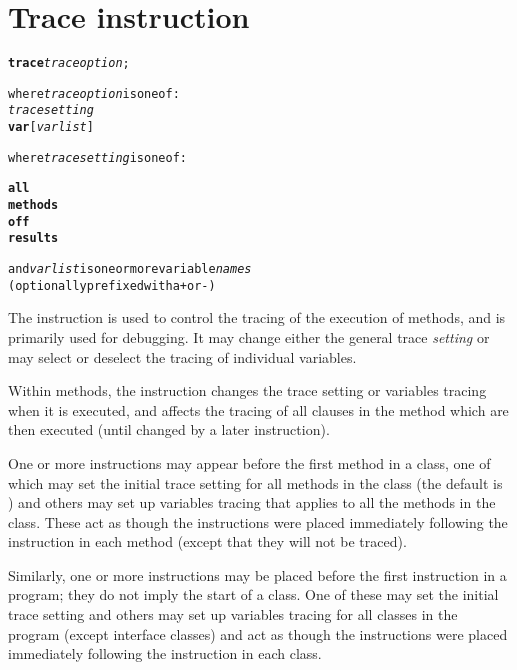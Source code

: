 \chapter{Trace instruction}\label{reftrace}
\index{,}
\index{,}
\begin{shaded}
\begin{alltt}
\textbf{trace} \emph{traceoption};

where \emph{traceoption} is one of:
    \emph{tracesetting}
    \textbf{var} [\emph{varlist}]

where \emph{tracesetting} is one of:

    \textbf{all}
    \textbf{methods}
    \textbf{off}
    \textbf{results}

    and \emph{varlist} is one or more variable \emph{names}
    (optionally prefixed with a \texttt{+} or \texttt{-})
\end{alltt}
\end{shaded}
 The  instruction is used to control the tracing of the
execution of \nr{} methods, and is primarily used for debugging.
It may change either the general trace \emph{setting} or may select
or deselect the tracing of individual variables.
 
Within methods, the  instruction changes the trace setting
or variables tracing when it is executed, and affects the tracing of
all clauses in the method which are then executed (until changed by a
later  instruction).
 
One or more  instructions may appear before the first
method in a class, one of which may set the initial trace setting
for all methods in the class (the default is ) and others
may set up variables tracing that applies to all the methods in the
class.
These act as though the  instructions were
placed immediately following the  instruction in each
method (except that they will not be traced).
 
Similarly, one or more  instructions may be placed
before the first  instruction in a program; they do not
imply the start of a class.  One of these may set the initial trace
setting and others may set up variables tracing for all classes in
the program (except interface classes) and act as though the
 instructions were placed immediately following the
 instruction in each class.
